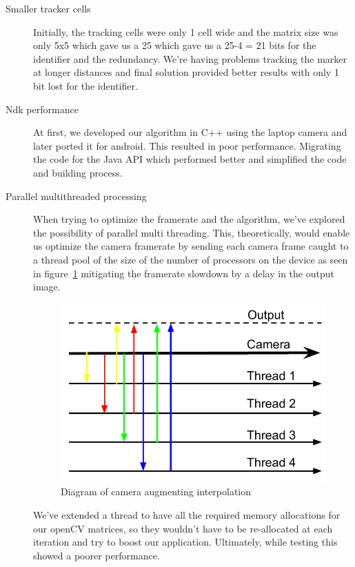 \documentclass[DIV=calc, paper=a4, fontsize=11pt, twocolumn]{scrartcl}	 %
\begin{document}
\begin{description}
\item[Smaller tracker cells]
Initially, the tracking cells were only 1 cell wide and the matrix size was only 5x5 which gave us a 25 which gave us a 25-4 = 21 bits for the identifier and the redundancy.
We're having problems tracking the marker at longer distances and final solution provided better results with only 1 bit lost for the identifier.

\item[Ndk performance]
At first, we developed our algorithm in C++ using the laptop camera and later ported it for android. This resulted in poor performance. Migrating the code for the Java API which performed better and simplified the code and building process.

\item[Parallel multithreaded processing]
When trying to optimize the framerate and the algorithm, we've explored the possibility of parallel multi threading. This, theoretically, would enable us optimize the camera framerate by sending each camera frame caught to a thread pool of the size of the number of processors on the device as seen in figure~\ref{fig:threading} mitigating the framerate slowdown by a delay in the output image. 

\begin{figure}[!h]
    \centering
    \includegraphics[width=0.9\columnwidth]{threading.pdf}
    \caption{Diagram of camera augmenting interpolation}
    \label{fig:threading}
\end{figure}

We've extended a thread to have all the required memory allocations for our openCV matrices, so they wouldn't have to be re-allocated at each iteration and try to boost our application.
Ultimately, while testing this showed a poorer performance.

\end{description}
\end{document}
